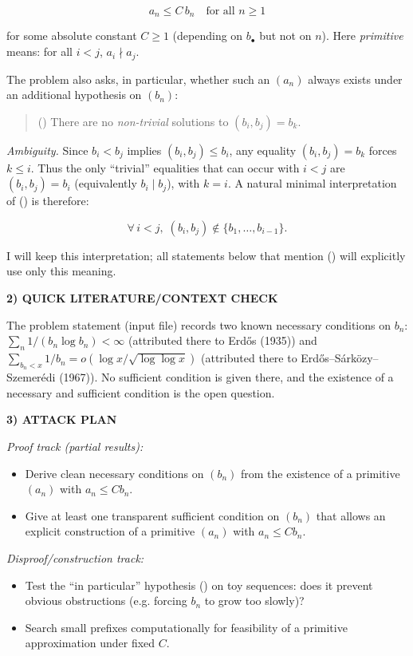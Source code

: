 \[ a_n \le C\, b_n \quad \text{for all } n\ge 1 \]

for some absolute constant $C\ge 1$ (depending on $b_\bullet$ but not on $n$).
Here \emph{primitive} means: for all $i<j$, $a_i\nmid a_j$.

The problem also asks, in particular, whether such an $(a_n)$ always exists under
an additional hypothesis on $(b_n)$:

\begin{quote}
(\*) There are no \emph{non-trivial} solutions to $(b_i,b_j)=b_k$.
\end{quote}

\emph{Ambiguity.} Since $b_i<b_j$ implies $(b_i,b_j)\le b_i$, any equality
$(b_i,b_j)=b_k$ forces $k\le i$. Thus the only “trivial” equalities that can
occur with $i<j$ are $(b_i,b_j)=b_i$ (equivalently $b_i\mid b_j$), with $k=i$.
A natural minimal interpretation of (\*) is therefore:

\[ \forall\, i<j,\; (b_i,b_j)\notin\{b_1,\dots,b_{i-1}\}. \]

I will keep this interpretation; all statements below that mention (\*) will
explicitly use only this meaning.

\medskip
\noindent\textbf{2) QUICK LITERATURE/CONTEXT CHECK}

The problem statement (input file) records two known necessary conditions on $b_n$:
\(\sum_n 1/(b_n\log b_n)<\infty\) (attributed there to Erd\H{o}s (1935)) and
\(\sum_{b_n<x}1/b_n = o(\log x/\sqrt{\log\log x})\) (attributed there to
Erd\H{o}s--S\'{a}rk\"{o}zy--Szemer\'{e}di (1967)).
No sufficient condition is given there, and the existence of a necessary and
sufficient condition is the open question.

\medskip
\noindent\textbf{3) ATTACK PLAN}

\emph{Proof track (partial results):}
\begin{itemize}
\item Derive clean necessary conditions on $(b_n)$ from the existence of a
primitive $(a_n)$ with $a_n\le Cb_n$.
\item Give at least one transparent sufficient condition on $(b_n)$ that allows
an explicit construction of a primitive $(a_n)$ with $a_n\le Cb_n$.
\end{itemize}

\emph{Disproof/construction track:}
\begin{itemize}
\item Test the “in particular” hypothesis (\*) on toy sequences: does it prevent
obvious obstructions (e.g. forcing $b_n$ to grow too slowly)?
\item Search small prefixes computationally for feasibility of a primitive
approximation under fixed $C$.
\end{itemize}

